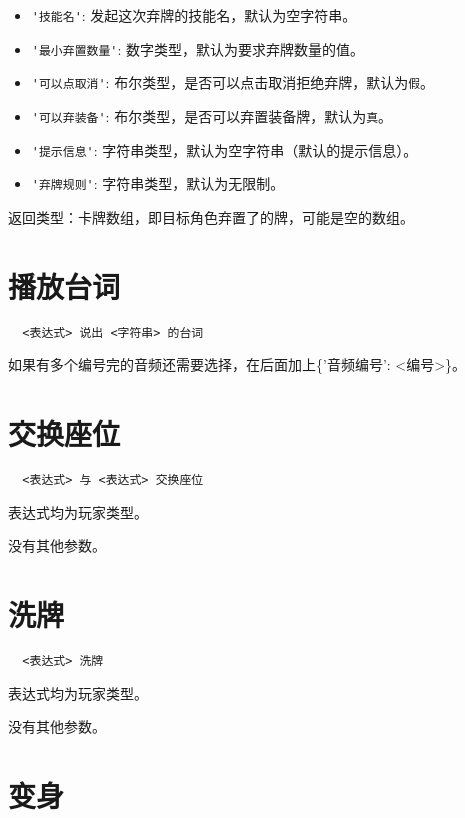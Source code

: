 \begin{itemize}
  \item \verb|'技能名'|: 发起这次弃牌的技能名，默认为空字符串。
  \item \verb|'最小弃置数量'|: 数字类型，默认为要求弃牌数量的值。
  \item \verb|'可以点取消'|: 布尔类型，是否可以点击取消拒绝弃牌，默认为\verb|假|。
  \item \verb|'可以弃装备'|: 布尔类型，是否可以弃置装备牌，默认为\verb|真|。
  \item \verb|'提示信息'|: 字符串类型，默认为空字符串（默认的提示信息）。
  \item \verb|'弃牌规则'|: 字符串类型，默认为无限制。
\end{itemize}

返回类型：卡牌数组，即目标角色弃置了的牌，可能是空的数组。

\section{播放台词}

\begin{verbatim}
  <表达式> 说出 <字符串> 的台词
\end{verbatim}

如果有多个编号完的音频还需要选择，在后面加上\{'音频编号': <编号>\}。

\section{交换座位}

\begin{verbatim}
  <表达式> 与 <表达式> 交换座位
\end{verbatim}

表达式均为玩家类型。

没有其他参数。

\section{洗牌}

\begin{verbatim}
  <表达式> 洗牌
\end{verbatim}

表达式均为玩家类型。

没有其他参数。

\section{变身}

